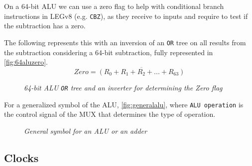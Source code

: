 \documentclass[11pt]{article}
\begin{document}
On a 64-bit ALU we can use a zero flag \label{jmp:zero-flag} to help with conditional branch instructions in LEGv8 (e.g. \texttt{CBZ}), as they receive to inputs and require to test if the subtraction has a zero.

The following represents this with an inversion of an \texttt{OR} tree on all results from the subtraction considering a 64-bit subtraction, fully represented in \autoref{fig:64aluzero}.
\vspace{-1em}
$$Zero = \overline{(R_0 + R_1 + R_2 + ... + R_{63})}$$
\vspace{-3em}

\begin{figure}[htbp]
    \centering
    \caption{\textit{64-bit ALU \texttt{OR} tree and an inverter for determining the Zero flag}}
    \label{fig:64aluzero}
\end{figure}

For a generalized symbol of the ALU, \autoref{fig:generalalu}, where \texttt{ALU operation} is the control signal of the MUX that determines the type of operation.

\begin{figure}[htbp]
    \centering
    \caption{\textit{General symbol for an ALU or an adder}}
    \label{fig:generalalu}
\end{figure}

\pagebreak

\subsection*{Clocks}
\end{document}

